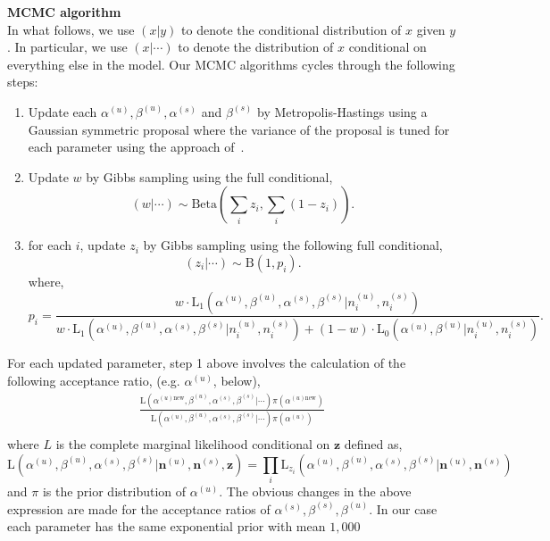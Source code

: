 \documentclass{article}
\begin{document}
\noindent\textbf{MCMC algorithm}\\
In what follows, we use $(x|y)$ to denote the conditional distribution of $x$ given $y$. In particular, we use $(x|\cdots)$ to denote the distribution of $x$ conditional on everything else in the model. Our MCMC algorithms cycles through the following steps:
\begin{enumerate}
\item Update each $\alpha^{(u)}, \beta^{(u)}, \alpha^{(s)}$ and $\beta^{(s)}$ by Metropolis-Hastings using a Gaussian symmetric proposal where the variance of the proposal is tuned for each parameter using the approach of~\cite{Gelman:2004tc}.
\item Update $w$ by Gibbs sampling using the full conditional,
\[
(w|\cdots)\sim \mathrm{Beta}(\sum_i z_i,\sum_i (1-z_i)).
\]
\item for each $i$, update $z_i$ by Gibbs sampling using the following full conditional,
\[
(z_i|\cdots)\sim\mathrm{B}(1,p_i).
\]
where,
\[
p_i=\frac{w\cdot\mathrm{L_1}(\alpha^{(u)},\beta^{(u)},\alpha^{(s)},\beta^{(s)}| n^{(u)}_{i},n^{(s)}_{i})}{w\cdot\mathrm{L_1}(\alpha^{(u)},\beta^{(u)},\alpha^{(s)},\beta^{(s)}|n^{(u)}_{i},n^{(s)}_{i})+(1-w)\cdot\mathrm{L_0}(\alpha^{(u)},\beta^{(u)}|n^{(u)}_{i},n^{(s)}_{i})}.
\]
\end{enumerate}
For each updated parameter, step 1 above involves the calculation of the following acceptance ratio, (e.g. $\alpha^{(u)}$, below),
\[
\begin{split}
\frac{\mathrm{L}(\alpha^{(u)\text{new}},\beta^{(u)},\alpha^{(s)},\beta^{(s)}|\cdots)\pi(\alpha^{(u)\text{new}})}{\mathrm{L}(\alpha^{(u)},\beta^{(u)},\alpha^{(s)},\beta^{(s)}|\cdots)\pi(\alpha^{(u)})}\\
\end{split}
\]
where $L$ is the complete marginal likelihood conditional on $\mathbf{z}$ defined as,
\[
\mathrm{L}(\alpha^{(u)},\beta^{(u)},\alpha^{(s)},\beta^{(s)}|\mathbf{n}^{(u)},\mathbf{n}^{(s)},\mathbf{z})=\prod_i\mathrm{L}_{z_i}(\alpha^{(u)},\beta^{(u)},\alpha^{(s)},\beta^{(s)}|\mathbf{n}^{(u)},\mathbf{n}^{(s)})
\]
and $\pi$ is the prior distribution of $\alpha^{(u)}$. The obvious changes in the above expression are made for the acceptance ratios of $\alpha^{(s)},\beta^{(s)},\beta^{(u)}$. In our case each parameter has the same exponential prior with mean $1,000$
\end{document}
